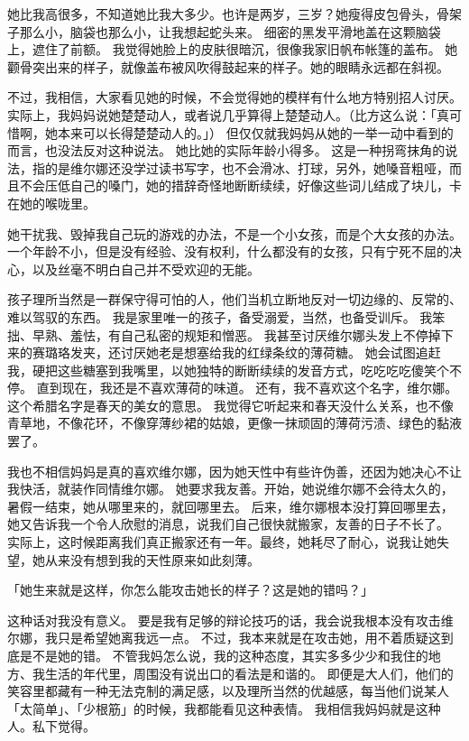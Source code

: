 \documentclass[UTF8]{ctexart}
\begin{document}
她比我高很多，不知道她比我大多少。也许是两岁，三岁？她瘦得皮包骨头，骨架子那么小，脑袋也那么小，让我想起蛇头来。
细密的黑发平滑地盖在这颗脑袋上，遮住了前额。
我觉得她脸上的皮肤很暗沉，很像我家旧帆布帐篷的盖布。
她颧骨突出来的样子，就像盖布被风吹得鼓起来的样子。她的眼睛永远都在斜视。

不过，我相信，大家看见她的时候，不会觉得她的模样有什么地方特别招人讨厌。
实际上，我妈妈说她楚楚动人，或者说几乎算得上楚楚动人。（比方这么说：「真可惜啊，她本来可以长得楚楚动人的。」）
但仅仅就我妈妈从她的一举一动中看到的而言，也没法反对这种说法。
她比她的实际年龄小得多。
这是一种拐弯抹角的说法，指的是维尔娜还没学过读书写字，也不会滑冰、打球，另外，她嗓音粗哑，而且不会压低自己的嗓门，她的措辞奇怪地断断续续，好像这些词儿结成了块儿，卡在她的喉咙里。

她干扰我、毁掉我自己玩的游戏的办法，不是一个小女孩，而是个大女孩的办法。
一个年龄不小，但是没有经验、没有权利，什么都没有的女孩，只有宁死不屈的决心，以及丝毫不明白自己并不受欢迎的无能。

孩子理所当然是一群保守得可怕的人，他们当机立断地反对一切边缘的、反常的、难以驾驭的东西。
我是家里唯一的孩子，备受溺爱，当然，也备受训斥。
我笨拙、早熟、羞怯，有自己私密的规矩和憎恶。
我甚至讨厌维尔娜头发上不停掉下来的赛璐珞发夹，还讨厌她老是想塞给我的红绿条纹的薄荷糖。
她会试图追赶我，硬把这些糖塞到我嘴里，以她独特的断断续续的发音方式，吃吃吃吃傻笑个不停。
直到现在，我还是不喜欢薄荷的味道。
还有，我不喜欢这个名字，维尔娜。这个希腊名字是春天的美女的意思。
我觉得它听起来和春天没什么关系，也不像青草地，不像花环，不像穿薄纱裙的姑娘，更像一抹顽固的薄荷污渍、绿色的黏液罢了。

我也不相信妈妈是真的喜欢维尔娜，因为她天性中有些许伪善，还因为她决心不让我快活，就装作同情维尔娜。
她要求我友善。开始，她说维尔娜不会待太久的，暑假一结束，她从哪里来的，就回哪里去。
后来，维尔娜根本没打算回哪里去，她又告诉我一个令人欣慰的消息，说我们自己很快就搬家，友善的日子不长了。
实际上，这时候距离我们真正搬家还有一年。最终，她耗尽了耐心，说我让她失望，她从来没有想到我的天性原来如此刻薄。

「她生来就是这样，你怎么能攻击她长的样子？这是她的错吗？」

这种话对我没有意义。
要是我有足够的辩论技巧的话，我会说我根本没有攻击维尔娜，我只是希望她离我远一点。
不过，我本来就是在攻击她，用不着质疑这到底是不是她的错。
不管我妈怎么说，我的这种态度，其实多多少少和我住的地方、我生活的年代里，周围没有说出口的看法是和谐的。
即便是大人们，他们的笑容里都藏有一种无法克制的满足感，以及理所当然的优越感，每当他们说某人「太简单」、「少根筋」的时候，我都能看见这种表情。
我相信我妈妈就是这种人。私下觉得。
\end{document}
